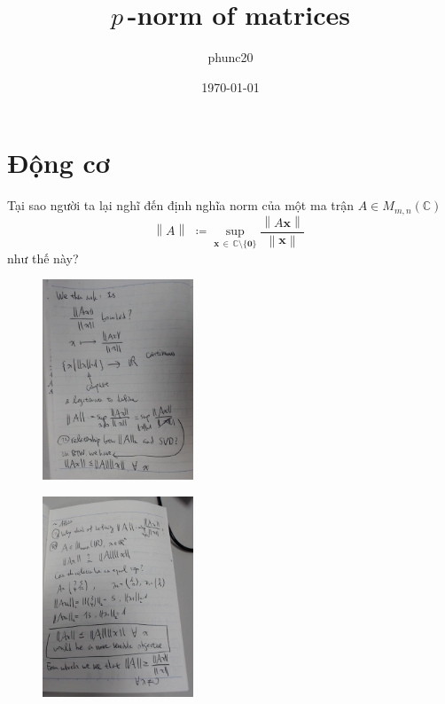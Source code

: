 \documentclass{article}
\title{$p\,$-norm of matrices}
\author{phunc20}
\date{\today}
\newcommand{\norm}[1]{\left\lVert#1\right\rVert}
\begin{document}
\maketitle
\section{Động cơ}
Tại sao người ta lại nghĩ đến định nghĩa norm của một ma trận $A \in M_{m,n}(\mathbb{C})$
$$\norm{A} \,\,\coloneqq\!\! \sup_{\mathbf{x} \,\in\, {\mathbb{C} \setminus \{\mathbf{0}\}}} \frac{\norm{A\mathbf{x}}}{\norm{\mathbf{x}}}\;$$
như thế này?


\begin{figure}
\includegraphics[width=0.4\textwidth]{02-moti_cont.jpg}
\end{figure}
\blindtext

\begin{figure}
\includegraphics[width=0.4\textwidth]{01-motivation.jpg}
\end{figure}

\blindtext

\end{document}

